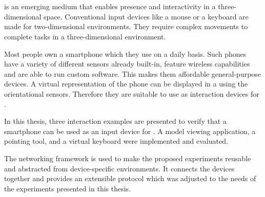 \chapter{\abstractname}

 is an emerging medium that enables presence and interactivity in a three-dimensional space. Conventional input devices like a mouse or a keyboard are made for two-dimensional environments. They require complex movements to complete tasks in a three-dimensional environment.%

Most people own a smartphone which they use on a daily basis. Such phones have a variety of different sensors already built-in, feature wireless capabilities and are able to run custom software. This makes them affordable general-purpose devices. A virtual representation of the phone can be displayed in a  using the orientational sensors. Therefore they are suitable to use as interaction devices for .

In this thesis, three interaction examples are presented to verify that a smartphone can be used as an input device for . A model viewing application, a pointing tool, and a virtual keyboard were implemented and evaluated. 

The  networking framework is used to make the proposed experiments reusable and abstracted from device-specific environments. It connects the devices together and provides an extensible protocol which was adjusted to the needs of the experiments presented in this thesis.